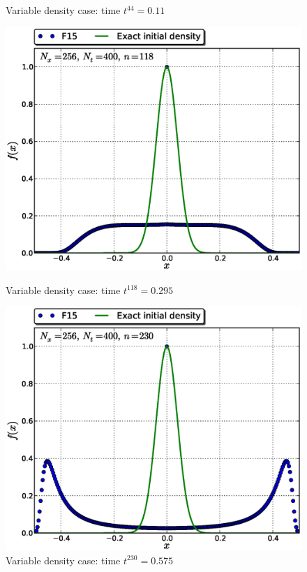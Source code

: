 \documentclass[11pt,titlepage]{report}
\begin{document}
\begin{figure}[h!]
\begin{minipage}[b]{0.5\linewidth}
\caption{Variable density case: time $t^{44} = 0.11$}
\vspace{4ex}
\end{minipage} 
\begin{minipage}[b]{0.5\linewidth}
\centering
\includegraphics[width=\linewidth]{graphics/f_N_v_S_F15_Nx256Nt400_w_f0_it00118}
\caption{Variable density case: time $t^{118} = 0.295$}
\vspace{4ex}
\end{minipage}%
\begin{minipage}[b]{0.5\linewidth}
\centering
\includegraphics[width=\linewidth]{graphics/f_N_v_S_F15_Nx256Nt400_w_f0_it00230}
\caption{Variable density case: time $t^{230} = 0.575$}
\vspace{4ex}
\end{minipage} 
\end{figure}
\end{document}
